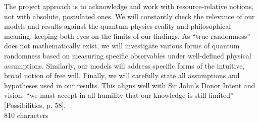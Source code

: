 \documentclass[11pt,  a4paper]{article}
\newcommand{\andre}[1]{\textcolor{blue}{#1  (Andre)}}
\newcommand{\cris}[1]{\textcolor{magenta}{#1} (Cris)}
\begin{document}
The project approach is to acknowledge and work with  resource-relative notions, not with absolute, postulated ones.  We will constantly check the relevance of our models and results against the quantum physics reality and philosophical meaning,
keeping   both  eyes on  the limits of our findings.
 As ``true randomness'' does not mathematically exist, we will investigate various  forms of quantum randomness based on measuring specific observables under well-defined physical assumptions.
 Similarly, our models  will address specific forms of the intuitive, broad notion of  free will. Finally, we will carefully state all assumptions and hypotheses used in our results.
This aligns well with Sir John’s Donor Intent and vision:
``we must accept in all humility that our knowledge is still limited'' [Possibilities, p. 58].\\

{\color{red} 810 characters}
%
%
\end{document}
